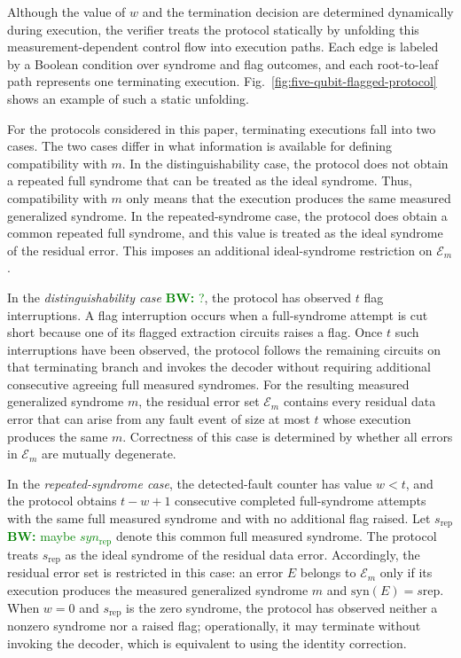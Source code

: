 \documentclass[acmsmall,screen,review,anonymous,nonacm]{acmart}
\newcommand{\showcomment}[1]{#1}
\newcommand{\bw}[1]{\showcomment{\textcolor{green}{\textbf{BW:} #1}}}
\begin{document}
Although the value of $w$ and the termination decision are determined dynamically during execution, the verifier treats the protocol statically by unfolding this measurement-dependent control flow into execution paths. Each edge is labeled by a Boolean condition over syndrome and flag outcomes, and each root-to-leaf path represents one terminating execution. Fig.~\ref{fig:five-qubit-flagged-protocol} shows an example of such a static unfolding.

For the protocols considered in this paper, terminating executions fall into two cases. The two cases differ in what information is available for defining compatibility with $m$. In the distinguishability case, the protocol does not obtain a repeated full syndrome that can be treated as the ideal syndrome. Thus, compatibility with $m$ only means that the execution produces the same measured generalized syndrome. In the repeated-syndrome case, the protocol does obtain a common repeated full syndrome, and this value is treated as the ideal syndrome of the residual error. This imposes an additional ideal-syndrome restriction on $\mathcal{E}_m$.

In the \emph{distinguishability case} \bw{?}, the protocol has observed $t$ flag interruptions. A flag interruption occurs when a full-syndrome attempt is cut short because one of its flagged extraction circuits raises a flag. Once $t$ such interruptions have been observed, the protocol follows the remaining circuits on that terminating branch and invokes the decoder without requiring additional consecutive agreeing full measured syndromes. For the resulting measured generalized syndrome $m$, the residual error set $\mathcal{E}_m$ contains every residual data error that can arise from any fault event of size at most $t$ whose execution produces the same $m$. Correctness of this case is determined by whether all errors in $\mathcal{E}_m$ are mutually degenerate.

In the \emph{repeated-syndrome case}, the detected-fault counter has value $w<t$, and the protocol obtains $t-w+1$ consecutive completed full-syndrome attempts with the same full measured syndrome and with no additional flag raised. Let $s_{\mathrm{rep}}$ \bw{maybe $syn_{\mathrm{rep}}$ } denote this common full measured syndrome. The protocol treats $s_{\mathrm{rep}}$ as the ideal syndrome of the residual data error. Accordingly, the residual error set is restricted in this case: an error $E$ belongs to $\mathcal{E}_m$ only if its execution produces the measured generalized syndrome $m$ and $\mathrm{syn}(E)=s{\mathrm{rep}}$. When $w=0$ and $s_{\mathrm{rep}}$ is the zero syndrome, the protocol has observed neither a nonzero syndrome nor a raised flag; operationally, it may terminate without invoking the decoder, which is equivalent to using the identity correction.
\end{document}
